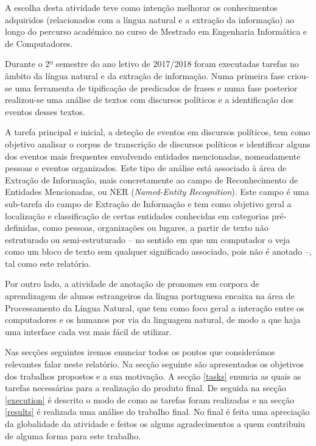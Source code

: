 \documentclass[a4paper,12pt,journal,twoside,compsoc]{PPIEEEtran}
\begin{document}
A escolha desta atividade teve como intenção melhorar os conhecimentos adquiridos (relacionados com a língua natural e a extração da informação) ao longo do percurso académico no curso de Mestrado em Engenharia Informática e de Computadores.

Durante o 2º semestre do ano letivo de 2017/2018 foram executadas tarefas no âmbito da língua natural e da extração de informação. Numa primeira fase criou-se uma ferramenta de tipificação de predicados de frases e numa fase posterior realizou-se uma análise de textos com discursos políticos e a identificação dos eventos desses textos.

A tarefa principal e inicial, a deteção de eventos em discursos políticos, tem como objetivo analisar o corpus de transcrição de discursos políticos e identificar alguns dos eventos mais frequentes envolvendo entidades mencionadas, nomeadamente pessoas e eventos organizados. Este tipo de análise está associado à área de Extração de Informação, mais concretamente ao campo de Reconhecimento de Entidades Mencionadas, ou NER (\textit{Named-Entity Recognition}). Este campo é uma sub-tarefa do campo de Extração de Informação e tem como objetivo geral a localização e classificação de certas entidades conhecidas em categorias pré-definidas, como pessoas, organizações ou lugares, a partir de texto não estruturado ou semi-estruturado -- no sentido em que um computador o veja como um bloco de texto sem qualquer significado associado, pois não é anotado --, tal como este relatório.

Por outro lado, a atividade de anotação de pronomes em corpora de aprendizagem de alunos estrangeiros da língua portuguesa encaixa na área de Processamento da Língua Natural, que tem como foco geral a interação entre os computadores e os humanos por via da linguagem natural, de modo a que haja uma interface cada vez mais fácil de utilizar.

Nas secções seguintes iremos enunciar todos os pontos que considerámos relevantes falar neste relatório. Na secção seguinte são apresentados os objetivos dos trabalhos propostos e a sua motivação. A secção \ref{tasks} enuncia as quais as tarefas necessárias para a realização do produto final.
De seguida na secção \ref{execution} é descrito o modo de como as tarefas foram realizadas e na secção \ref{results} é realizada uma análise do trabalho final. No final é feita uma apreciação da globalidade da atividade e feitos os alguns agradecimentos a quem contribuiu de alguma forma para este trabalho.
\end{document}
